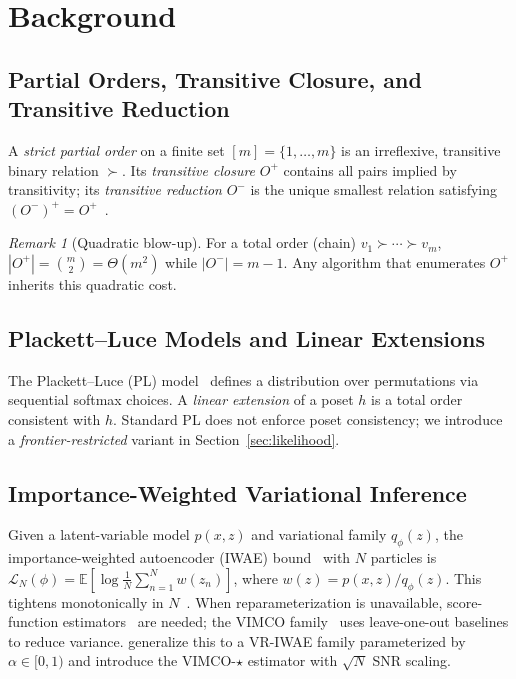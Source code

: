 \documentclass{article}
\theoremstyle{definition}
\theoremstyle{remark}
\newtheorem{remark}[theorem]{Remark}
\newcommand{\E}{\mathbb{E}}
\begin{document}
\section{Background}
\label{sec:background}

\subsection{Partial Orders, Transitive Closure, and Transitive Reduction}
A \emph{strict partial order} on a finite set $[m]=\{1,\dots,m\}$ is an
irreflexive, transitive binary relation $\succ$.
Its \emph{transitive closure} $O^+$ contains all pairs implied by
transitivity; its \emph{transitive reduction} $O^-$ is the unique smallest
relation satisfying $(O^-)^+=O^+$~\citep{davey2002introduction}.

\begin{remark}[Quadratic blow-up]
\label{rem:blowup}
For a total order (chain) $v_1\succ\cdots\succ v_m$,
$|O^+|=\binom{m}{2}=\Theta(m^2)$ while $|O^-|=m-1$.
Any algorithm that enumerates $O^+$ inherits this quadratic cost.
\end{remark}

\subsection{Plackett--Luce Models and Linear Extensions}
The Plackett--Luce (PL) model~\citep{plackett1975luce,luce1959individual}
defines a distribution over permutations via sequential softmax choices.
A \emph{linear extension} of a poset $h$ is a total order consistent with
$h$.
Standard PL does not enforce poset consistency; we introduce a
\emph{frontier-restricted} variant in Section~\ref{sec:likelihood}.

\subsection{Importance-Weighted Variational Inference}
Given a latent-variable model $p(x,z)$ and variational family $q_\phi(z)$,
the importance-weighted autoencoder (IWAE)
bound~\citep{burda2016iwae} with $N$ particles is
$\mathcal{L}_N(\phi)=\E[\log\frac{1}{N}\sum_{n=1}^N w(z_n)]$,
where $w(z)=p(x,z)/q_\phi(z)$.
This tightens monotonically in $N$~\citep{burda2016iwae}.
When reparameterization is unavailable, score-function
estimators~\citep{williams1992reinforce} are needed; the VIMCO
family~\citep{mnih2016vimco} uses leave-one-out baselines to reduce
variance.
\citet{daudel2026importance} generalize this to a VR-IWAE family
parameterized by $\alpha\in[0,1)$ and introduce the VIMCO-$\star$
estimator with $\sqrt{N}$ SNR scaling.
\end{document}

